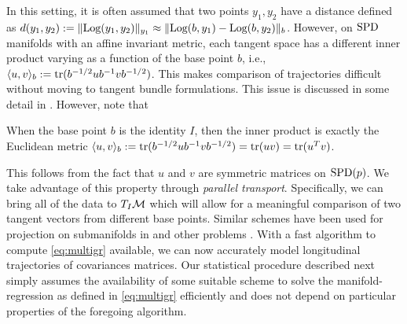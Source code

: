 In this setting, it is often assumed that two points $y_1,y_2$ have a distance defined as $d(y_1,y_2) := \| \text{Log}(y_1,y_2) \|_{y_1} \approx \| \text{Log}(b,y_1)-\text{Log}(b,y_2) \|_{b}$. However,
on $\text{SPD}$ manifolds with an affine invariant metric, each tangent space has a different inner product varying as a function of the base point $b$, i.e., $\langle  u,v\rangle_b:= \text{tr} (b^{-1/2}ub^{-1}vb^{-1/2})$. This makes comparison of trajectories difficult without moving to tangent bundle formulations. This issue is discussed in some detail in \cite{muralidharan2012sasaki,hong2015group}. However, note that
\begin{remark}
When the base point $b$ is the identity $I$, then the inner product is exactly the Euclidean metric $\langle  u,v\rangle_b:= \text{tr} (b^{-1/2}ub^{-1}vb^{-1/2})=\text{tr} (uv)=\text{tr} (u^Tv)$.
\end{remark}
This follows from the fact that $u$ and $v$ are symmetric matrices on $\text{SPD}(p)$. We take advantage of this property
through \textit{parallel transport}. Specifically, we can bring all of the data to $T_{I}\mathcal{M}$ which will allow for a meaningful comparison of two tangent vectors from different base points.
Similar schemes have been used for projection on submanifolds in \cite{xie2010statistical} and other problems \cite{sommer2014optimization}. 
%
With a fast algorithm to compute \eqref{eq:multigr} available, we can now accurately model longitudinal trajectories of covariances matrices.
Our statistical procedure described next simply assumes 
the availability of some suitable scheme to solve the manifold-regression as defined in \eqref{eq:multigr} efficiently and does not
depend on particular properties of the foregoing algorithm. 
%

